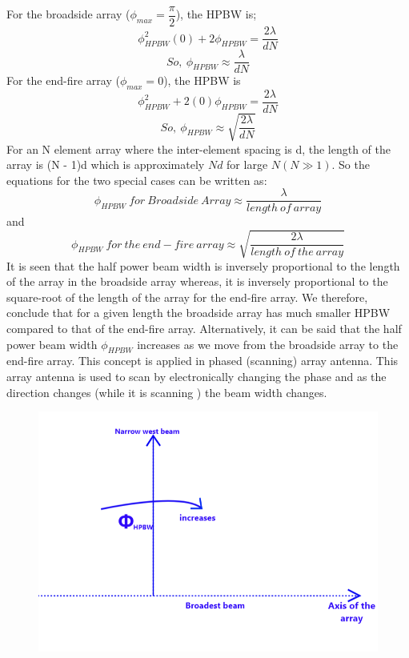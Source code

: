 For the broadside array ($\phi_{max} = \dfrac{\pi}{2}$), the HPBW is; 
$$ \phi^2_{HPBW}(0) + 2\phi_{HPBW} = \dfrac{2\lambda}{dN}$$
\begin{equation}
So, \ \phi_{HPBW} \approx \dfrac{\lambda}{dN}
\label{eqn39} 
\end{equation} 
For the end-fire array ($\phi_{max} = 0$), the HPBW is 
$$ \phi^2_{HPBW} + 2(0)\phi_{HPBW} = \dfrac{2\lambda}{dN} $$
\begin{equation}
So, \ \phi_{HPBW} \approx \sqrt{\dfrac{2\lambda}{dN}}
\label{eqn40}
\end{equation}
For an N element array where the inter-element spacing is d, the length of the array is (N - 1)d which is approximately $Nd$ for large $N(N\gg 1)$. So the equations for the two special cases can be written as: 
$$ \phi_{HPBW} \ for \ Broadside \ Array \approx \dfrac{\lambda}{length \ of \ array}$$ and
$$ \phi_{HPBW} \ for \ the \ end-fire \ array \approx \sqrt{\dfrac{2\lambda}{length \ of \  the \ array}}$$
It is seen that the half power beam width is inversely proportional to the length of the array in the broadside array whereas, it is inversely proportional to the square-root of the length of the array for the end-fire array. We therefore, conclude that for a given length the broadside array has much smaller HPBW compared to that of the end-fire array. Alternatively,
it can be said that the half power beam width $\phi_{HPBW}$ increases as we move from the broadside array to the end-fire array. This concept is applied in phased (scanning) array antenna. This array antenna is used to scan by electronically changing the phase and as the direction changes (while it is scanning ) the beam width changes.
\begin{figure}[h]
\includegraphics[width=1\linewidth]{./graphics/fig54_4}
\centering
\caption{}
\label{54.7}
\end{figure}

